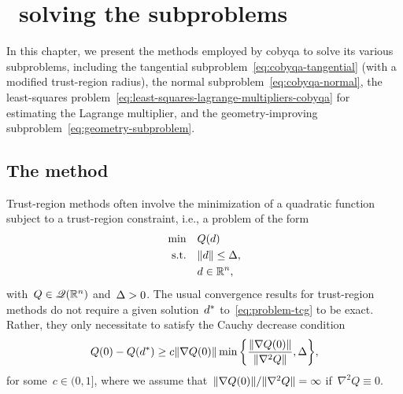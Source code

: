 %
%
%
\chapter{ \textemdash\ solving the subproblems}
\label{ch:cobyqa-subproblems}

In this chapter, we present the methods employed by \gls{cobyqa} to solve its various subproblems, including the tangential subproblem~\cref{eq:cobyqa-tangential} (with a modified trust-region radius), the normal subproblem~\cref{eq:cobyqa-normal}, the least-squares problem~\cref{eq:least-squares-lagrange-multipliers-cobyqa} for estimating the Lagrange multiplier, and the geometry-improving subproblem~\cref{eq:geometry-subproblem}.

\section{The  method}

Trust-region methods often involve the minimization of a quadratic function subject to a trust-region constraint, i.e., a problem of the form
\begin{subequations}
    \label{eq:problem-tcg}
    \begin{align}
        \min        & \quad Q(\step)\\
        \text{s.t.} & \quad \norm{\step} \le \rad,\\
                    & \quad \step \in \R^n, \nonumber
    \end{align}
\end{subequations}
with~$Q \in \mathscr{Q}(\mathbb{R}^n)$ and~$\rad > 0$.
The usual convergence results for trust-region methods do not require a given solution~$\step[\ast]$ to~\cref{eq:problem-tcg} to be exact.
Rather, they only necessitate to satisfy the Cauchy decrease condition
\begin{equation*}
    Q(0) - Q(\step[\ast]) \ge c \norm{\nabla Q(0)} \min \set[\bigg]{\frac{\norm{\nabla Q(0)}}{\norm{\nabla^2 Q}}, \rad},
\end{equation*}
for some~$c \in (0, 1]$, where we assume that~$\lVert\nabla Q(0)\rVert / \lVert\nabla^2 Q\rVert = \infty$ if~$\nabla^2 Q \equiv 0$.

